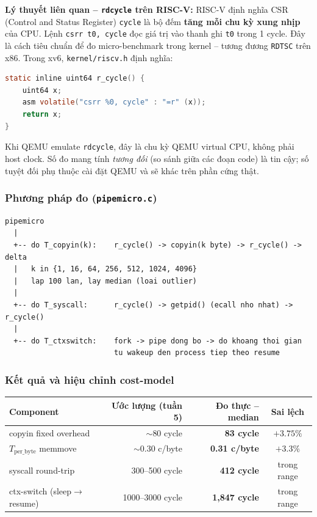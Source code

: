\documentclass[11pt,a4paper]{article}
\begin{document}
\begin{callout}
\textbf{Lý thuyết liên quan -- \texttt{rdcycle} trên RISC-V:} RISC-V định nghĩa CSR (Control and Status Register) \texttt{cycle} là bộ đếm \textbf{tăng mỗi chu kỳ xung nhịp} của CPU. Lệnh \texttt{csrr t0, cycle} đọc giá trị vào thanh ghi \texttt{t0} trong 1 cycle. Đây là cách tiêu chuẩn để đo micro-benchmark trong kernel -- tương đương \texttt{RDTSC} trên x86. Trong xv6, \texttt{kernel/riscv.h} định nghĩa:

\begin{lstlisting}[language=C]
static inline uint64 r_cycle() {
    uint64 x;
    asm volatile("csrr %0, cycle" : "=r" (x));
    return x;
}
\end{lstlisting}

Khi QEMU emulate \texttt{rdcycle}, đây là chu kỳ QEMU virtual CPU, không phải host clock. Số đo mang tính \emph{tương đối} (so sánh giữa các đoạn code) là tin cậy; số tuyệt đối phụ thuộc cài đặt QEMU và sẽ khác trên phần cứng thật.
\end{callout}

\subsubsection{Phương pháp đo (\texttt{pipemicro.c})}

\begin{lstlisting}[style=plain]
pipemicro
  |
  +-- do T_copyin(k):    r_cycle() -> copyin(k byte) -> r_cycle() -> delta
  |   k in {1, 16, 64, 256, 512, 1024, 4096}
  |   lap 100 lan, lay median (loai outlier)
  |
  +-- do T_syscall:      r_cycle() -> getpid() (ecall nho nhat) -> r_cycle()
  |
  +-- do T_ctxswitch:    fork -> pipe dong bo -> do khoang thoi gian
                         tu wakeup den process tiep theo resume
\end{lstlisting}

\subsubsection{Kết quả và hiệu chỉnh cost-model}

\begin{center}
\begin{tabularx}{0.95\linewidth}{Xrrc}
\toprule
\textbf{Component} & \textbf{Ước lượng (tuần 5)} & \textbf{Đo thực -- median} & \textbf{Sai lệch} \\
\midrule
copyin fixed overhead        & $\sim 80$ cycle      & \textbf{83 cycle}       & $+3.75\%$ \\
$T_{\text{per\_byte}}$ memmove & $\sim 0.30$ c/byte & \textbf{0.31 c/byte}    & $+3.3\%$ \\
syscall round-trip           & 300--500 cycle       & \textbf{412 cycle}      & trong range \\
ctx-switch (sleep$\rightarrow$resume) & 1000--3000 cycle & \textbf{1{,}847 cycle} & trong range \\
\bottomrule
\end{tabularx}
\end{center}
\end{document}
